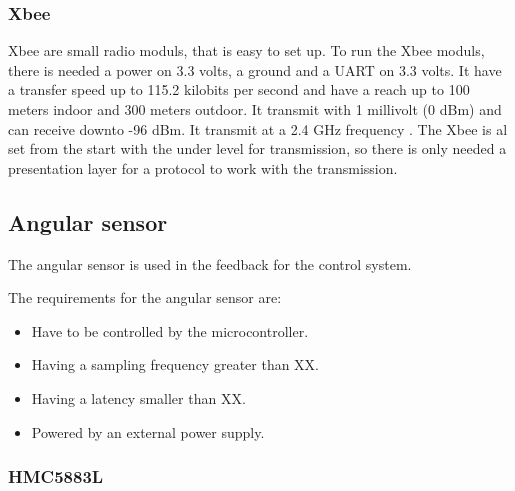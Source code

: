 \subsubsection{Xbee}
Xbee are small radio moduls, that is easy to set up. To run the Xbee moduls, there is needed a power on 3.3 volts, a ground and a UART on 3.3 volts. It have a transfer speed up to 115.2 kilobits per second and have a reach up to 100 meters indoor and 300 meters outdoor. It transmit with 1 millivolt (0 dBm) and can receive downto -96 dBm. It transmit at a 2.4 GHz frequency . The Xbee is al set from the start with the under level for transmission, so there is only needed a presentation layer for a protocol to work with the transmission.



\subsection{Angular sensor}
The angular sensor is used in the feedback for the control system.

The requirements for the angular sensor are:
\begin{itemize}
\item Have to be controlled by the microcontroller.
\item Having a sampling frequency greater than XX. 
\item Having a latency smaller than XX. 
\item Powered by an external power supply.
\end{itemize}

\subsubsection{HMC5883L}


%
%
%
%
%
%
%



